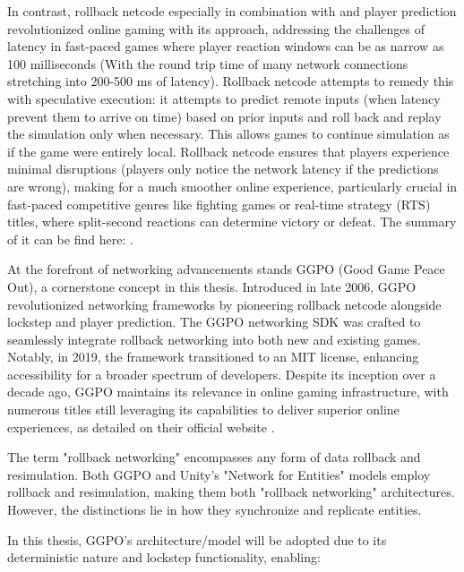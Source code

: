 In contrast, rollback netcode especially in combination with and player prediction revolutionized online gaming with its approach, addressing the challenges of latency in fast-paced games where player reaction windows can be as narrow as 100 milliseconds (With the round trip time of many network connections stretching into 200-500 ms of latency). Rollback netcode attempts to remedy this with speculative execution: it attempts to predict remote inputs (when latency prevent them to arrive on time) based on prior inputs and roll back and replay the simulation only when necessary. This allows games to continue simulation as if the game were entirely local. Rollback netcode ensures that players experience minimal disruptions (players only notice the network latency if the predictions are wrong), making for a much smoother online experience, particularly crucial in fast-paced competitive genres like fighting games or real-time strategy (RTS) titles, where split-second reactions can determine victory or defeat. The summary of it can be find here: \cite{Rollback_overview}.\newline

At the forefront of networking advancements stands GGPO (Good Game Peace Out), a cornerstone concept in this thesis. Introduced in late 2006, GGPO revolutionized networking frameworks by pioneering rollback netcode alongside lockstep and player prediction. The GGPO networking SDK was crafted to seamlessly integrate rollback networking into both new and existing games. Notably, in 2019, the framework transitioned to an MIT license, enhancing accessibility for a broader spectrum of developers. Despite its inception over a decade ago, GGPO maintains its relevance in online gaming infrastructure, with numerous titles still leveraging its capabilities to deliver superior online experiences, as detailed on their official website \cite{GGPO_page}. %

The term "rollback networking" encompasses any form of data rollback and resimulation. Both GGPO and Unity's "Network for Entities" models employ rollback and resimulation, making them both "rollback networking" architectures. However, the distinctions lie in how they synchronize and replicate entities.

In this thesis, GGPO's architecture/model will be adopted due to its deterministic nature and lockstep functionality, enabling:

